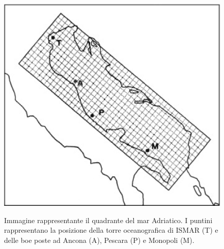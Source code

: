 \documentclass[./main.tex]{subfiles}
\begin{document}
\begin{figure}[!ht]
\noindent \begin{minipage}{0.5\textwidth}
\vspace{1cm}
\includegraphics[width=\textwidth]{images/mar_adriatico_grid.pdf}
\captionsetup{font=small, hypcap=false}
\label{fig:adriatico_grid}
\end{minipage}
\hspace{0.05\textwidth}
\begin{minipage}{0.4\textwidth}
\begin{small}
Immagine rappresentante il quadrante del mar Adriatico. I puntini rappresentano la posizione della torre oceanografica di ISMAR (T) e delle boe poste ad Ancona (A), Pescara (P) e Monopoli (M).
\end{small}
\end{minipage}
\vspace{0.25cm}
\end{figure}
\end{document}
